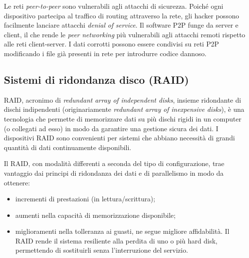 Le reti \textit{peer-to-peer} sono vulnerabili agli attacchi di sicurezza. Poich\'{e} ogni dispositivo partecipa al traffico di routing attraverso la rete, gli hacker possono facilmente lanciare attacchi \textit{denial of service}.
Il software P2P funge da server e client, il che rende le \textit{peer networking} pi\`{u} vulnerabili agli attacchi remoti rispetto alle reti client-server.
I dati corrotti possono essere condivisi su reti P2P modificando i file gi\`{a} presenti in rete per introdurre codice dannoso.\cite{etichetta14}

\item
\subsection{Sistemi di ridondanza disco (RAID)}
RAID, acronimo di \textit{redundant array of independent disks}, insieme ridondante di dischi indipendenti (originariamente \textit{redundant array of inexpensive disks}), \`{e} una tecnologia che permette di memorizzare dati su pi\`{u} dischi rigidi in un computer (o collegati ad esso) in modo da garantire una gestione sicura dei dati\cite{etichetta9}. I dispositivi RAID sono convenienti per sistemi che abbiano necessit\`{a} di grandi quantit\`{a} di dati continuamente disponibili. 


Il RAID, con modalit\`{a} differenti a seconda del tipo di configurazione, trae vantaggio dai principi di ridondanza dei dati e di parallelismo in modo da ottenere:
\begin{itemize}
\item 
incrementi di prestazioni (in lettura/scrittura);
\item
aumenti nella capacit\`{a} di memorizzazione disponibile;
\item 
miglioramenti nella tolleranza ai guasti, ne segue migliore affidabilit\`{a}\cite{etichetta10}. Il RAID rende il sistema resiliente alla perdita di uno o pi\`{u} hard disk, permettendo di sostituirli senza l'interruzione del servizio.
\end{itemize}

